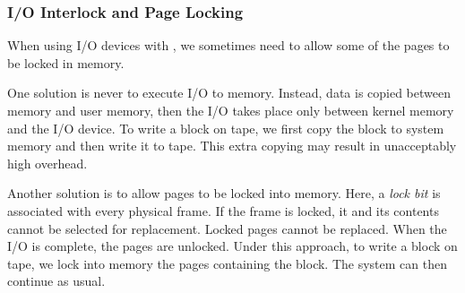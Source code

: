 \subsubsection{I/O Interlock and Page Locking}\label{IO:subsubsec_Interlock_Page_Locking}
When using I/O devices with , we sometimes need to allow some of the pages to be locked in memory.

One solution is never to execute I/O to  memory.
Instead, data is copied between  memory and user memory, then the I/O takes place only between kernel memory and the I/O device.
To write a block on tape, we first copy the block to system memory and then write it to tape.
This extra copying may result in unacceptably high overhead.

Another solution is to allow pages to be locked into memory.
Here, a \emph{lock bit} is associated with every physical frame.
If the frame is locked, it and its contents cannot be selected for replacement.
Locked pages cannot be replaced.
When the I/O is complete, the pages are unlocked.
Under this approach, to write a block on tape, we lock into memory the pages containing the block.
The system can then continue as usual.

